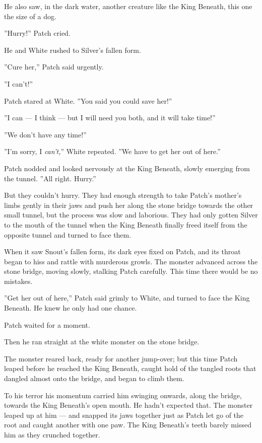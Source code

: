 \documentclass[12pt]{book}
\begin{document}
He also saw, in the dark water, another creature like the King
Beneath, this one the size of a dog.

''Hurry!'' Patch cried.

He and White rushed to Silver's fallen form.

''Cure her,'' Patch said urgently.

''I can't!''

Patch stared at White. ''You said you could save her!''

''I can --- I think --- but I will need you both, and it will take
time!''

''We don't have any time!''

''I'm sorry, I \textit{can't,}'' White repeated. ''We have to get her
out of here.''

Patch nodded and looked nervously at the King Beneath, slowly emerging
from the tunnel. ''All right. Hurry.''

But they couldn't hurry. They had enough strength to take Patch's
mother's limbs gently in their jaws and push her along the stone
bridge towards the other small tunnel, but the process was slow and
laborious. They had only gotten Silver to the mouth of the tunnel when
the King Beneath finally freed itself from the opposite tunnel and
turned to face them.

When it saw Snout's fallen form, its dark eyes fixed on Patch, and its
throat began to hiss and rattle with murderous growls. The monster
advanced across the stone bridge, moving slowly, stalking Patch
carefully. This time there would be no mistakes.

''Get her out of here,'' Patch said grimly to White, and turned to
face the King Beneath. He knew he only had one chance.

Patch waited for a moment.

Then he ran straight at the white monster on the stone bridge.

The monster reared back, ready for another jump-over; but this time
Patch leaped before he reached the King Beneath, caught hold of the
tangled roots that dangled almost onto the bridge, and began to climb
them.

To his terror his momentum carried him swinging onwards, along the
bridge, towards the King Beneath's open mouth. He hadn't expected
that. The monster leaped up at him --- and snapped its jaws together
just as Patch let go of the root and caught another with one paw. The
King Beneath's teeth barely missed him as they crunched together.
\end{document}
